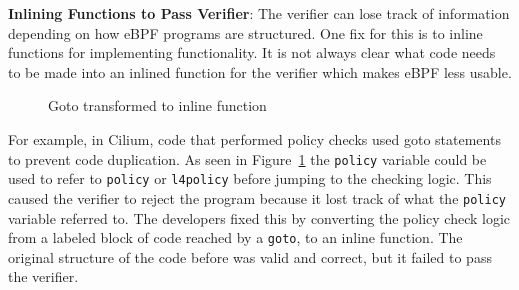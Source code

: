 \noindent\textbf{Inlining Functions to Pass Verifier}:
The verifier can lose track of information depending on how eBPF programs are structured.
One fix for this is to inline functions for implementing functionality.
It is not always clear what code needs to be made into an inlined function for the verifier
    which makes eBPF less usable.

\begin{figure}
    
    \vspace{-10pt}
    \caption{Goto transformed to inline function}
    \vspace{-10pt}
    \label{fig:inline-fig}
\end{figure}

%
%

For example, in Cilium, code that performed policy checks used goto statements to prevent code duplication.
As seen in Figure~\ref{fig:inline-fig} the \texttt{policy} variable could be used to refer to \texttt{policy} or \texttt{l4policy} before jumping to the checking logic.
This caused the verifier to reject the program because it lost track of what the \texttt{policy} variable referred to.
The developers fixed this by converting the policy check logic from a labeled block of code reached by a \texttt{goto}, to an inline function.
The original structure of the code before was valid and correct, but it failed to pass the verifier.


